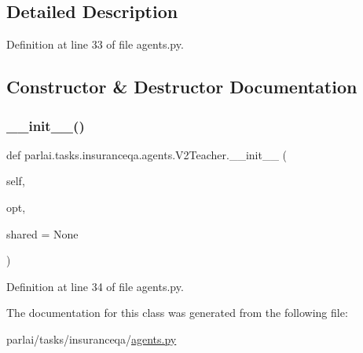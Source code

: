 \subsection{Detailed Description}


Definition at line 33 of file agents.\+py.



\subsection{Constructor \& Destructor Documentation}
\mbox{\label{classparlai_1_1tasks_1_1insuranceqa_1_1agents_1_1V2Teacher_aff5c049cb85ce4a1af8304373c908975}} 
\subsubsection{\texorpdfstring{\+\_\+\+\_\+init\+\_\+\+\_\+()}{\_\_init\_\_()}}
{\footnotesize\ttfamily def parlai.\+tasks.\+insuranceqa.\+agents.\+V2\+Teacher.\+\_\+\+\_\+init\+\_\+\+\_\+ (\begin{DoxyParamCaption}\item[{}]{self,  }\item[{}]{opt,  }\item[{}]{shared = {\ttfamily None} }\end{DoxyParamCaption})}



Definition at line 34 of file agents.\+py.



The documentation for this class was generated from the following file\+:\begin{DoxyCompactItemize}
\item 
parlai/tasks/insuranceqa/\hyperlink{parlai_2tasks_2insuranceqa_2agents_8py}{agents.\+py}\end{DoxyCompactItemize}
